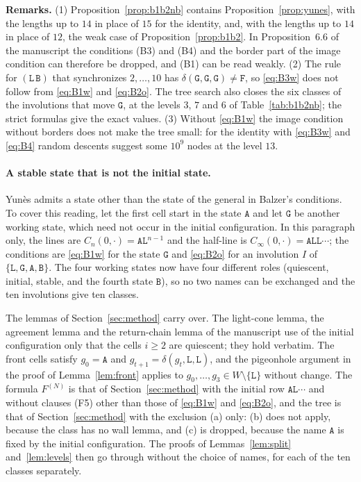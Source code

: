 \documentclass[11pt]{article}
\theoremstyle{remark}
\newcommand{\Lq}{\mathtt{L}}\newcommand{\Gq}{\mathtt{G}}\newcommand{\Aq}{\mathtt{A}}\newcommand{\Bq}{\mathtt{B}}\newcommand{\Fq}{\mathtt{F}}
\begin{document}
\noindent\textbf{Remarks.} (1) Proposition~\ref{prop:b1b2nb} contains Proposition~\ref{prop:yunes}, with the
lengths up to $14$ in place of $15$ for the identity, and, with the lengths up to $14$ in place of $12$, the
weak case of Proposition~\ref{prop:b1b2}. In Proposition~6.6 of
the manuscript the conditions (B3) and (B4) and the border part of the image condition can therefore be
dropped, and (B1) can be read weakly. (2) The rule for $(\Lq\,\Bq)$ that synchronizes $2,\dots,10$ has $\delta(\Gq,\Gq,\Gq)\ne\Fq$, so
\eqref{eq:B3w} does not follow from \eqref{eq:B1w} and \eqref{eq:B2o}. The tree search also closes the six
classes of the involutions that move $\Gq$, at the levels $3$, $7$ and $6$ of Table~\ref{tab:b1b2nb}; the
strict formulas give the exact values. (3) Without
\eqref{eq:B1w} the image condition without borders does not make the tree small: for the identity with
\eqref{eq:B3w} and \eqref{eq:B4} random descents suggest some $10^9$ nodes at the level $13$.

\paragraph{A stable state that is not the initial state.} Yun\`es admits a state other than the state of the
general in Balzer's conditions. To cover this reading, let the first cell start in the state $\Aq$ and let
$\Gq$ be another working state, which need not occur in the initial configuration. In this paragraph only, the
lines are $C_n(0,\cdot)=\Aq\Lq^{n-1}$ and the half-line is $C_\infty(0,\cdot)=\Aq\Lq\Lq\cdots$; the conditions
are \eqref{eq:B1w} for the state $\Gq$ and \eqref{eq:B2o} for an involution $I$ of
$\{\Lq,\Gq,\Aq,\Bq\}$. The four working states now have four different roles (quiescent, initial, stable, and
the fourth state $\Bq$), so no two names can be exchanged and the ten involutions give ten classes.

The lemmas of Section~\ref{sec:method} carry over. The light-cone lemma, the agreement lemma and the
return-chain lemma of the manuscript use of the initial configuration only that the cells $i\ge2$ are
quiescent; they hold verbatim. The front cells satisfy $g_0=\Aq$ and $g_{t+1}=\delta(g_t,\Lq,\Lq)$, and the
pigeonhole argument in the proof of Lemma~\ref{lem:front} applies to $g_0,\dots,g_3\in W\setminus\{\Lq\}$
without change. The formula $F^{(N)}$ is that of Section~\ref{sec:method} with the initial row
$\Aq\Lq\cdots$ and without clauses (F5) other than those of \eqref{eq:B1w} and \eqref{eq:B2o}, and the tree is
that of Section~\ref{sec:method} with the exclusion (a) only: (b) does not apply, because the class has no
wall lemma, and (c) is dropped, because the name $\Aq$ is fixed by the initial configuration. The proofs of
Lemmas~\ref{lem:split} and~\ref{lem:levels} then go through without the choice of names, for each of the ten
classes separately.
\end{document}
